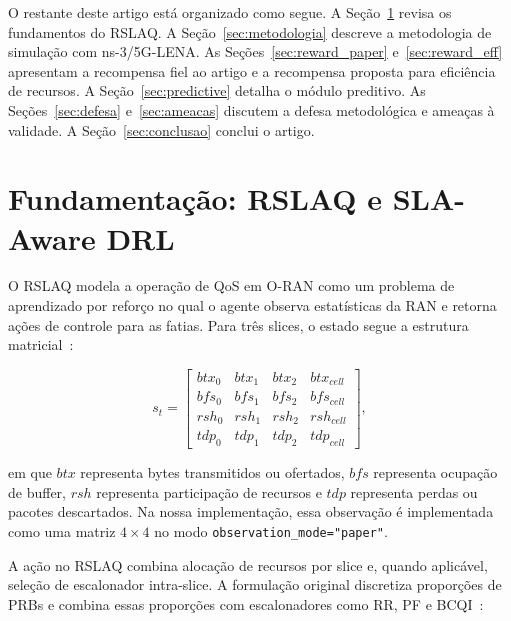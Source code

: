 \documentclass[10pt,a4paper]{IEEEtran}
\begin{document}
O restante deste artigo est\'{a} organizado como segue. A
Se\c{c}\~{a}o~\ref{sec:fundamentacao} revisa os fundamentos
do RSLAQ. A Se\c{c}\~{a}o~\ref{sec:metodologia} descreve a
metodologia de simula\c{c}\~{a}o com ns-3/5G-LENA. As
Se\c{c}\~{o}es~\ref{sec:reward_paper} e~\ref{sec:reward_eff}
apresentam a recompensa fiel ao artigo e a recompensa proposta
para efici\^{e}ncia de recursos. A
Se\c{c}\~{a}o~\ref{sec:predictive} detalha o m\'{o}dulo
preditivo. As Se\c{c}\~{o}es~\ref{sec:defesa} e~\ref{sec:ameacas}
discutem a defesa metodol\'{o}gica e amea\c{c}as \`{a} validade.
A Se\c{c}\~{a}o~\ref{sec:conclusao} conclui o artigo.

\section{Fundamenta\c{c}\~{a}o: RSLAQ e SLA-Aware DRL}
\label{sec:fundamentacao}

O RSLAQ modela a opera\c{c}\~{a}o de QoS em O-RAN como um
problema de aprendizado por refor\c{c}o no qual o agente observa
estat\'{i}sticas da RAN e retorna a\c{c}\~{o}es de controle para
as fatias. Para tr\^{e}s slices, o estado segue a estrutura
matricial~\cite{yungaicela2026rslaq}:

\begin{equation}
s_t =
\begin{bmatrix}
btx_{0} & btx_{1} & btx_{2} & btx_{cell} \\
bfs_{0} & bfs_{1} & bfs_{2} & bfs_{cell} \\
rsh_{0} & rsh_{1} & rsh_{2} & rsh_{cell} \\
tdp_{0} & tdp_{1} & tdp_{2} & tdp_{cell}
\end{bmatrix},
\label{eq:state}
\end{equation}

em que $btx$ representa bytes transmitidos ou ofertados, $bfs$
representa ocupa\c{c}\~{a}o de buffer, $rsh$ representa
participa\c{c}\~{a}o de recursos e $tdp$ representa perdas ou
pacotes descartados. Na nossa implementa\c{c}\~{a}o, essa
observa\c{c}\~{a}o \'{e} implementada como uma matriz
$4 \times 4$ no modo \texttt{observation\_mode="paper"}.

A a\c{c}\~{a}o no RSLAQ combina aloca\c{c}\~{a}o de recursos
por slice e, quando aplic\'{a}vel, sele\c{c}\~{a}o de escalonador
intra-slice. A formula\c{c}\~{a}o original discretiza
propor\c{c}\~{o}es de PRBs e combina essas propor\c{c}\~{o}es
com escalonadores como RR, PF e BCQI~\cite{yungaicela2026rslaq}:
\end{document}
